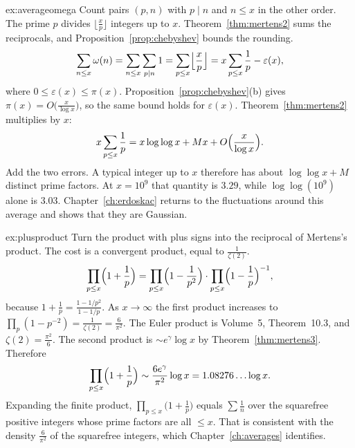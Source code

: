 \begin{solution}{ex:averageomega}
\idea Count pairs $(p,n)$ with $p\mid n$ and $n\le x$ in the other order. The prime $p$ divides $\bigl\lfloor\frac xp\bigr\rfloor$ integers up to $x$. Theorem~\ref{thm:mertens2} sums the reciprocals, and Proposition~\ref{prop:chebyshev} bounds the rounding.
\writeup
\[
\sum_{n\le x}\omega(n)=\sum_{n\le x}\sum_{p\mid n}1=\sum_{p\le x}\Bigl\lfloor\frac xp\Bigr\rfloor=x\sum_{p\le x}\frac1p-\varepsilon(x),
\]
where $0\le\varepsilon(x)\le\pi(x)$. Proposition~\ref{prop:chebyshev}(b) gives $\pi(x)=O\bigl(\frac x{\log x}\bigr)$, so the same bound holds for $\varepsilon(x)$. Theorem~\ref{thm:mertens2} multiplies by $x$:
\[
x\sum_{p\le x}\frac1p=x\log\log x+Mx+O\Bigl(\frac x{\log x}\Bigr).
\]
Add the two errors. A typical integer up to $x$ therefore has about $\log\log x+M$ distinct prime factors. At $x=10^9$ that quantity is $3.29$, while $\log\log(10^9)$ alone is $3.03$. Chapter~\ref{ch:erdoskac} returns to the fluctuations around this average and shows that they are Gaussian.
\end{solution}

\begin{solution}{ex:plusproduct}
\idea Turn the product with plus signs into the reciprocal of Mertens's product. The cost is a convergent product, equal to $\frac1{\zeta(2)}$.
\writeup
\[
\prod_{p\le x}\Bigl(1+\frac1p\Bigr)=\prod_{p\le x}\Bigl(1-\frac1{p^2}\Bigr)\cdot\prod_{p\le x}\Bigl(1-\frac1p\Bigr)^{-1},
\]
because $1+\frac1p=\frac{1-1/p^2}{1-1/p}$. As $x\to\infty$ the first product increases to $\prod_p(1-p^{-2})=\frac1{\zeta(2)}=\frac6{\pi^2}$. The Euler product is Volume~5, Theorem~10.3, and $\zeta(2)=\frac{\pi^2}6$. The second product is $\sim e^\gamma\log x$ by Theorem~\ref{thm:mertens3}. Therefore
\[
\prod_{p\le x}\Bigl(1+\frac1p\Bigr)\sim\frac{6e^\gamma}{\pi^2}\log x=1.08276\ldots\log x.
\]
Expanding the finite product, $\prod_{p\le x}\bigl(1+\frac1p\bigr)$ equals $\sum\frac1n$ over the squarefree positive integers whose prime factors are all $\le x$. That is consistent with the density $\frac6{\pi^2}$ of the squarefree integers, which Chapter~\ref{ch:averages} identifies.
\end{solution}

